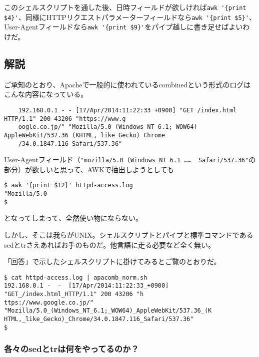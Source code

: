 このシェルスクリプトを通した後、日時フィールドが欲しければ\verb|awk '{print $4}'|、同様にHTTPリクエストパラメーターフィールドなら\verb|awk '{print $5}'|、User-Agentフィールドなら\verb|awk '{print $9}'|をパイプ越しに書き足せばよいわけだ。

\subsection*{解説}

ご承知のとおり、Apacheで一般的に使われているcombinedという形式のログはこんな内容になっている。\\
\begin{frameboxit}{160.0mm}
\begin{verbatim}
	192.168.0.1 - - [17/Apr/2014:11:22:33 +0900] "GET /index.html HTTP/1.1" 200 43206 "https://www.g
	oogle.co.jp/" "Mozilla/5.0 (Windows NT 6.1; WOW64) AppleWebKit/537.36 (KHTML, like Gecko) Chrome
	/34.0.1847.116 Safari/537.36"
\end{verbatim}
\end{frameboxit}

User-Agentフィールド（\verb|"mozilla/5.0 (Windows NT 6.1 ……  Safari/537.36"|の部分）が欲しいと思って、AWKで抽出しようとしても
\begin{screen}
	\verb|$ awk '{print $12}' httpd-access.log| \return \\
	\verb|"Mozilla/5.0| \\
	\verb|$ |
\end{screen}
となってしまって、全然使い物にならない。

しかし、そこは我らがUNIX。シェルスクリプトとパイプと標準コマンドであるsedとtrさえあればお手のものだ。他言語に走る必要など全く無い。

「回答」で示したシェルスクリプトに掛けてみるとご覧のとおりだ。
\begin{screen}
	\verb!$ cat httpd-access.log | apacomb_norm.sh! \return \\
	\verb|192.168.0.1 -  -  [17/Apr/2014:11:22:33_+0900] "GET_/index.html_HTTP/1.1" 200 43206 "h| \\
	\verb|ttps://www.google.co.jp/" "Mozilla/5.0_(Windows_NT_6.1;_WOW64)_AppleWebKit/537.36_(K| \\
	\verb|HTML,_like_Gecko)_Chrome/34.0.1847.116_Safari/537.36"| \\
	\verb|$ |
\end{screen}

\subsubsection*{各々のsedとtrは何をやってるのか？}

